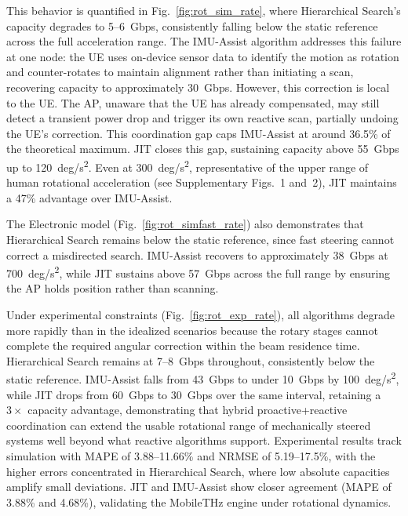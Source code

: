 \documentclass[fleqn,10pt]{wlscirep}
\newcommand{\rev}[1]{{\color{revblue}#1}}
\begin{document}
This behavior is quantified in Fig.~\ref{fig:rot_sim_rate}, where Hierarchical Search's capacity degrades to \SI{5}{}--\SI{6}{Gbps}, consistently falling below the static reference across the full acceleration range. The IMU-Assist algorithm addresses this failure at one node: the UE uses on-device sensor data to identify the motion as rotation and counter-rotates to maintain alignment rather than initiating a scan, recovering capacity to approximately \SI{30}{Gbps}. However, this correction is local to the UE. The AP, unaware that the UE has already compensated, may still detect a transient power drop and trigger its own reactive scan, partially undoing the UE's correction. This coordination gap caps IMU-Assist at around 36.5\% of the theoretical maximum. JIT closes this gap, sustaining capacity above \SI{55}{Gbps} up to \SI{120}{deg/s^2}. Even at \SI{300}{deg/s^2}, representative of the upper range of human rotational acceleration (see Supplementary Figs.~1 and~2), JIT maintains a 47\% advantage over IMU-Assist.

The Electronic model (Fig.~\ref{fig:rot_simfast_rate}) also demonstrates that Hierarchical Search remains below the static reference, since fast steering cannot correct a misdirected search. IMU-Assist recovers to approximately \rev{\SI{38}{Gbps}} at \rev{\SI{700}{deg/s^2}}, while JIT sustains above \SI{57}{Gbps} across the full range by ensuring the AP holds position rather than scanning.

Under experimental constraints (Fig.~\ref{fig:rot_exp_rate}), all algorithms degrade more rapidly than in the idealized scenarios because the rotary stages cannot complete the required angular correction within the beam residence time. Hierarchical Search remains at \SI{7}{}--\SI{8}{Gbps} throughout, consistently below the static reference. IMU-Assist falls from \SI{43}{Gbps} to under \SI{10}{Gbps} by \SI{100}{deg/s^2}, while JIT drops from \SI{60}{Gbps} to \SI{30}{Gbps} over the same interval, retaining a $3\times$ capacity advantage, demonstrating that hybrid proactive+reactive coordination can extend the usable rotational range of mechanically steered systems well beyond what reactive algorithms support. Experimental results track simulation with MAPE of 3.88--11.66\% and NRMSE of 5.19--17.5\%, with the higher errors concentrated in Hierarchical Search, where low absolute capacities amplify small deviations. JIT and IMU-Assist show closer agreement (MAPE of 3.88\% and 4.68\%), validating the MobileTHz engine under rotational dynamics.
\end{document}

